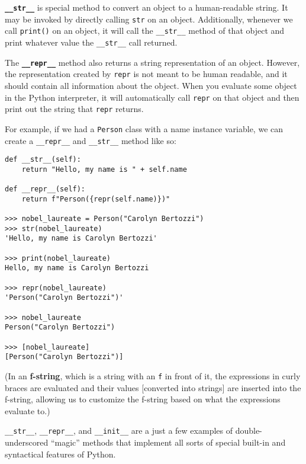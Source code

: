 \textbf{\lstinline{__str__}} is special method to convert an object to a human-readable string. It may be invoked by directly calling \lstinline{str} on an object. Additionally, whenever we call \lstinline{print()} on an object, it will call the \lstinline{__str__} method of that object and print whatever value the \lstinline{__str__} call returned. 

The \textbf{\lstinline{__repr__}} method also returns a string representation of an object. However, the representation created by \lstinline{repr} is not meant to be human readable, and it should contain all information about the object. When you evaluate some object in the Python interpreter, it will automatically call \lstinline{repr} on that object and then print out the string that \lstinline{repr} returns. 

For example, if we had a \lstinline{Person} class with a name instance variable, we can create a \lstinline{__repr__} and \lstinline{__str__} method like so:
\begin{lstlisting}
def __str__(self):
    return "Hello, my name is " + self.name

def __repr__(self):
    return f"Person({repr(self.name)})"

>>> nobel_laureate = Person("Carolyn Bertozzi")
>>> str(nobel_laureate)
'Hello, my name is Carolyn Bertozzi'

>>> print(nobel_laureate)          
Hello, my name is Carolyn Bertozzi

>>> repr(nobel_laureate)
'Person("Carolyn Bertozzi")'

>>> nobel_laureate
Person("Carolyn Bertozzi")

>>> [nobel_laureate]
[Person("Carolyn Bertozzi")]
\end{lstlisting}

(In an \textbf{f-string}, which is a string with an \lstinline{f} in front of it, the expressions in curly braces are evaluated and their values [converted into strings] are inserted into the f-string, allowing us to customize the f-string based on what the expressions evaluate to.)

\lstinline{__str__}, \lstinline{__repr__}, and \lstinline{__init__} are a just a few examples of double-underscored ``magic'' methods that implement all sorts of special built-in and syntactical features of Python. 